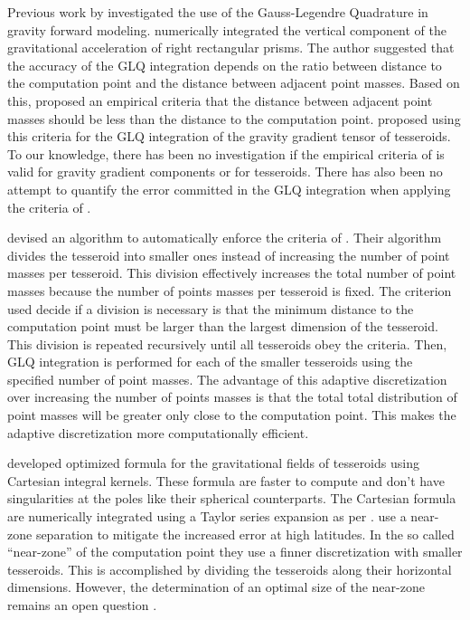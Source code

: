 \documentclass[paper,twocolumn]{geophysics}
\begin{document}
Previous work by \citet{Ku1977} investigated the use of the Gauss-Legendre
Quadrature in gravity forward modeling.
\citet{Ku1977} numerically integrated the vertical component of the
gravitational acceleration of right rectangular prisms.
The author suggested that the accuracy of the GLQ integration depends on
the ratio between distance to the computation point and the distance between
adjacent point masses.
Based on this, \citet{Ku1977} proposed an empirical criteria that the distance
between adjacent point masses should be less than the distance to the computation point.
\citet{Asgharzadeh2007} proposed using this criteria for the GLQ integration of
the gravity gradient tensor of tesseroids.
To our knowledge, there has been no investigation if the empirical criteria of
\citet{Ku1977} is valid for gravity gradient components or for tesseroids.
There has also been no attempt to quantify the error committed in the GLQ
integration when applying the criteria of \citet{Ku1977}.


\citet{Li2011} devised an algorithm to automatically enforce the criteria of
\citet{Ku1977}.
Their algorithm divides the tesseroid into smaller ones instead of increasing
the number of point masses per tesseroid.
This division effectively increases the total number of point masses
because the number of points masses per tesseroid is fixed.
The criterion used decide if a division is necessary is
that the minimum distance to the computation point must be larger than
the largest dimension of the tesseroid.
This division is repeated recursively until all tesseroids obey the criteria.
Then, GLQ integration is performed for each of the smaller tesseroids
using the specified number of point masses.
The advantage of this adaptive discretization over
increasing the number of points masses is that the
total total distribution of point masses will be greater
only close to the computation point.
This makes the adaptive discretization more computationally efficient.


\citet{Grombein2013} developed optimized formula for the gravitational fields
of tesseroids using Cartesian integral kernels.
These formula are faster to compute and don't have singularities at the poles
like their spherical counterparts.
The Cartesian formula are numerically integrated using a Taylor series
expansion as per \citet{Heck2007}.
\citet{Grombein2013} use a near-zone separation to mitigate the increased error
at high latitudes.
In the so called ``near-zone'' of the computation point they use a finner
discretization with smaller tesseroids.
This is accomplished by dividing the tesseroids along their horizontal
dimensions.
However, the determination of an optimal size of the near-zone remains an
open question \citep{Grombein2013}.
\end{document}
